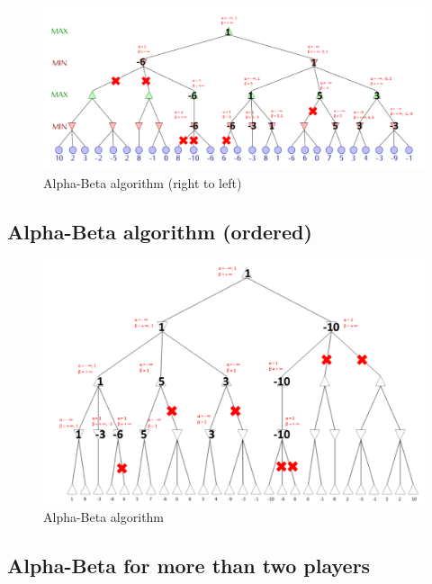 \documentclass[en]{article}
\begin{document}
\begin{figure}[H]
 \centering
 \includegraphics[width=\textwidth]{Alphabeta_reverse.png}
 \caption{Alpha-Beta algorithm (right to left)}
 \label{fig:alphabeta_reverse}
\end{figure}


\subsection{Alpha-Beta algorithm (ordered)}

\begin{figure}[H]
 \centering
 \includegraphics[width=\textwidth]{Alphabeta_ordered.png}
 \caption{Alpha-Beta algorithm}
 \label{fig:alphabeta_ordered}
\end{figure}

\subsection{Alpha-Beta for more than two players}
\end{document}
